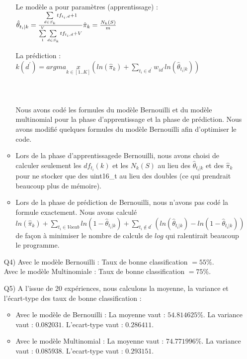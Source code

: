 \documentclass[a4paper, 12pt]{article}
\begin{document}
\begin{enumerate}
\begin{itemize}
Le modèle a pour paramètres (apprentissage) :\\
\begin{math}
   \hat{\theta}_{t_{i}|k}=\frac{ \sum\limits_{d\in S_k}{ tf_{t_{i} , d} + 1 } }{ \sum \limits_{1}^{V} { \sum \limits_{d \in S_{k}} {tf_{t_{i}, d} + V } } } \\
   \hat{\pi}_{k} = \frac{N_{k}(S)}{m}
\end{math}  

La prédiction :\\
\begin{math}
   k(d^{'})=argmax\limits_{ k \in [1..K] } ( ln(\hat{\pi}_{k}) + \sum\limits_{ t_{i} \in d^{'} } { w_{id^{'}}ln(\hat{\theta}_{t_{i}|k}) } )
\end{math}   
\\
\\
\\
\\
Nous avons codé les formules du modèle Bernouilli et du modèle multinomial pour la phase d'apprentissage et la phase de prédiction. Nous avons modifié quelques formules du modèle Bernouilli afin d'optimiser le code. 
\item Lors de la phase d'apprentissagede Bernouilli, nous avons choisi de calculer seulement les $df_{t_{i}}(k)$ et les $N_{k}(S)$ au lieu des $\hat{\theta}_{t_{i}|k}$ et des $\hat{\pi}_{k}$ pour ne stocker que des uint16\_t au lieu des doubles (ce qui prendrait beaucoup plus de mémoire).
\item Lors de la phase de prédiction de Bernouilli, nous n'avons pas codé la formule exactement. Nous avons calculé 
$ ln( \hat{\pi}_{k} ) + \sum\limits_{ t_{i} \in Vocab } { ln(1-\hat{\theta}_{t_{i}|k}) } + \sum\limits_{ t_{i} \notin d^{'} } ({ ln( \hat{\theta}_{ t_{i} | k } )-ln( 1-\hat{\theta}_{ t_{i} | k } ) }) $ de façon à minimiser le nombre de calculs de $log$ qui ralentirait beaucoup le programme.
\end{itemize}

\item[Q4)]
Avec le modèle Bernouilli : Taux de bonne classification $= 55\%$.\\
Avec le modèle Multinomiale : Taux de bonne classification $= 75\%$.\\

\item[Q5)]
A l'issue de 20 expériences, nous calculons la moyenne, la variance et l'écart-type des taux de bonne classification : \\
\begin{itemize}
\item Avec le modèle de Bernouilli : La moyenne vaut : $54.814625\%$. La variance vaut : $0.082031$. L'ecart-type vaut : $0.286411$.
\item Avec le modèle Multinomial : La moyenne vaut : $74.771996\%$. La variance vaut : $0.085938$. L'ecart-type vaut : $0.293151$.
\end{itemize}
\end{enumerate}
\end{document}
